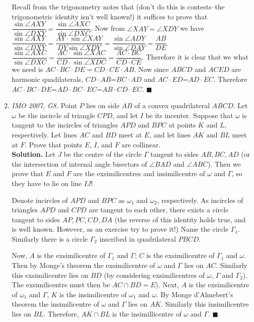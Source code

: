 \documentclass[11pt,a4paper]{article}
\begin{document}
\begin{enumerate}
Recall from the trigonometry notes that (don't do this is contests--the trigonometric identity isn't well known!) it suffices to prove that $\dfrac{\sin\angle AXY}{\sin\angle DXY}=\dfrac{\sin\angle AXC}{\sin\angle DXC}$. Now from $\angle XAY=\angle XDY$ we have $\dfrac{\sin\angle AXY}{\sin\angle DXY}=\dfrac{AY\cdot\sin\angle XAY}{DY\sin\angle XDY}=\dfrac{\sin\angle ADY}{\sin\angle DAY}=\dfrac{AB}{DE}.$ $\dfrac{\sin\angle AXC}{\sin\angle DXC}=\dfrac{AC\cdot \sin\angle XAC}{CD\cdot\sin\angle XDC}=\dfrac{AC\cdot BC}{CD\cdot CE}$. Therefore it is clear that we what we need is $AC\cdot BC\cdot DE=CD\cdot CE\cdot AB$. Now since $ABCD$ and $ACED$ are harmonic quadilaterals, $CD\cdot AB$=$BC\cdot AD$ and $AC\cdot ED$=$AD\cdot EC$. Therefore $AC\cdot BC\cdot DE$=$AD\cdot BC\cdot EC$=$AB\cdot CD\cdot EC$. $\blacksquare$

\item\emph {IMO 2007, G8.} Point $ P$ lies on side $ AB$ of a convex quadrilateral $ ABCD$. Let $ \omega$ be the incircle of triangle $ CPD$, and let $ I$ be its incenter. Suppose that $ \omega$ is tangent to the incircles of triangles $ APD$ and $ BPC$ at points $ K$ and $ L$, respectively. Let lines $ AC$ and $ BD$ meet at $ E$, and let lines $ AK$ and $ BL$ meet at $ F$. Prove that points $ E$, $ I$, and $ F$ are collinear.\\
\textbf {Solution.} Let $J$ be the centre of the circle $\Gamma$ tangent to sides $AB, BC, AD$ (or the intersection of internal angle bisectors of $\angle BAD$ and $\angle ABC$). Then we prove that $E$ and $F$ are the exsimilicentres and insimilicentre of $\omega$ and $\Gamma$, so they have to lie on line $IJ$!

Denote incircles of $APD$ and $BPC$ as $\omega_1$ and $\omega_2$, respectively. As incircles of triangles $APD$ and $CPD$ are tangent to each other, there exists a circle tangent to sides $AP, PC, CD, DA$ (the reverse of this identity holds true, and is well known. However, as an exercise try to prove it!) Name the circle $\Gamma_1$. Similarly there is a circle $\Gamma_2$ inscribed in quadrilateral $PBCD$.

Now, $A$ is the exsimilicentre of $\Gamma_1$ and $\Gamma$; $C$ is the exsimilicentre of $\Gamma_1$ and $\omega$. Then by Monge's theorem the exsimilicentre of $\omega$ and $\Gamma$ lies on $AC$. Similarly this exsimilicentre lies on $BD$ (by considering exsimilicentres of $\omega$, $\Gamma$ and $\Gamma_2$). The exsimilicentre must then be $AC\cap BD=E$). Next, $A$ is the exsimilicentre of $\omega_1$ and $\Gamma$, $K$ is the insimilicentre of $\omega_1$ and $\omega$. By Monge d'Almebert's theorem the insimilicentre of $\omega$ and $\Gamma$ lies on $AK$. Similarly this insimilicentre lies on $BL$. Therefore, $AK\cap BL$ is the insimillicentre of $\omega$ and $\Gamma$. $\blacksquare$


\end{enumerate}
\end{document}
